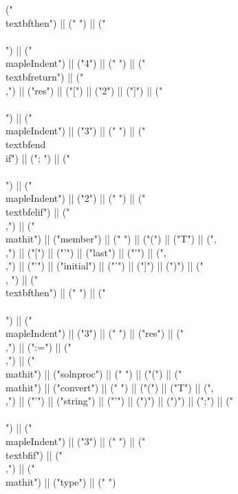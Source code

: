 \documentclass{article}
\begin{document}
\begin{center}
\begin{maplelatex}
{("\\textbf{then}") || (" ") || ("\\\\\n") || ("\\mapleIndent{") || ("4") || ("} ") || ("\\textbf{return}") || ("\\,") || ("res") || ("[") || ("2") || ("]") || ("\\\\\n") || ("\\mapleIndent{") || ("3") || ("} ") || ("\\textbf{end\\ if}") || ("; ") || ("\\\\\n") || ("\\mapleIndent{") || ("2") || ("} ") || ("\\textbf{elif}") || (" \\,") || ("\\mathit{") || ("member") || ("} ") || ("(") || ("T") || (",\\,") || ("[") || ("'") || ("last") || ("'") || (",\\,") || ("'") || ("initial") || ("'") || ("]") || (")") || (" \\, ") || ("\\textbf{then}") || (" ") || ("\\\\\n") || ("\\mapleIndent{") || ("3") || ("} ") || ("res") || ("\\,") || (":=") || ("\\,") || ("\\mathit{") || ("solnproc") || ("} ") || ("(") || ("\\mathit{") || ("convert") || ("} ") || ("(") || ("T") || (",\\,") || ("'") || ("string") || ("'") || (")") || (")") || (";") || ("\\\\\n") || ("\\mapleIndent{") || ("3") || ("} ") || ("\\textbf{if}") || (" \\,") || ("\\mathit{") || ("type") || ("} ") }
\end{maplelatex}
\end{center}
\end{document}
